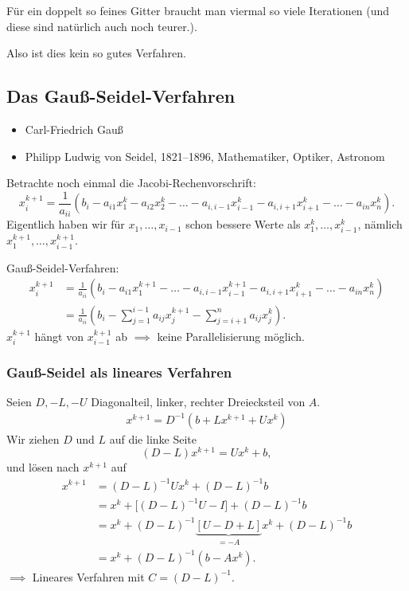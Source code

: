 Für ein doppelt so feines Gitter braucht man viermal so viele Iterationen
(und diese sind natürlich auch noch teurer.).

Also ist dies kein so gutes Verfahren.

\subsection{Das Gauß-Seidel-Verfahren}

\begin{itemize}
 \item Carl-Friedrich Gauß
 \item Philipp Ludwig von Seidel, 1821--1896, Mathematiker, Optiker, Astronom
\end{itemize}


Betrachte noch einmal die Jacobi-Rechenvorschrift:
\begin{equation*}
 x_i^{k+1}
 =
 \frac{1}{a_{ii}} \left(b_i-a_{i1}x_1^{k} - a_{i2}x_2^{k}-
   \ldots -a_{i,i-1}x_{i-1}^k - a_{i,i+1}x_{i+1}^k - \ldots - a_{in}x_n^k \right).
\end{equation*}
Eigentlich haben wir für $x_1,\ldots,x_{i-1}$ schon bessere Werte als $x_1^k,\ldots,x_{i-1}^k$, nämlich $x_1^{k+1},\ldots,x_{i-1}^{k+1}$.

Gauß-Seidel-Verfahren:
\begin{align*}
    x_i^{k+1} & =\frac{1}{a_{ii}} \left(b_i-a_{i1}x_1^{k+1} - \ldots -a_{i,i-1}x_{i-1}^{k+1}-a_{i,i+1}x_{i+1}^k-\ldots-a_{in}x_n^k \right) \\
    & = \frac{1}{a_{ii}} \left(b_i-\sum_{j=1}^{i-1} a_{ij}x_j^{k+1} -\sum_{j=i+1}^n a_{ij} x_j^k \right).
\end{align*}
$x_i^{k+1}$ hängt von $x_{i-1}^{k+1}$ ab $\implies$ keine Parallelisierung möglich.

\subsubsection{Gauß-Seidel als lineares Verfahren}
Seien $D,-L,-U$ Diagonalteil, linker, rechter Dreiecksteil von $A$.
\begin{align*}
    x^{k+1} =D^{-1} (b+Lx^{k+1}+Ux^k)
\end{align*}
Wir ziehen $D$ und $L$ auf die linke Seite
\begin{equation*}
    (D-L) x^{k+1} = Ux^k + b,
\end{equation*}
und lösen nach $x^{k+1}$ auf
\begin{align*}
    x^{k+1} & = ( D-L)^{-1} Ux^k + (D-L)^{-1} b \\
    & = x^k+\big[(D-L)^{-1}U-I \big] + (D-L)^{-1} b \\
    & = x^k+ (D-L)^{-1} \underbrace{[U-D+L]}_{=-A} x^k + (D-L)^{-1}b \\
    & =x^k + (D-L)^{-1} (b-Ax^k).
\end{align*}
$\implies$ Lineares Verfahren mit $C=(D-L)^{-1}$.

